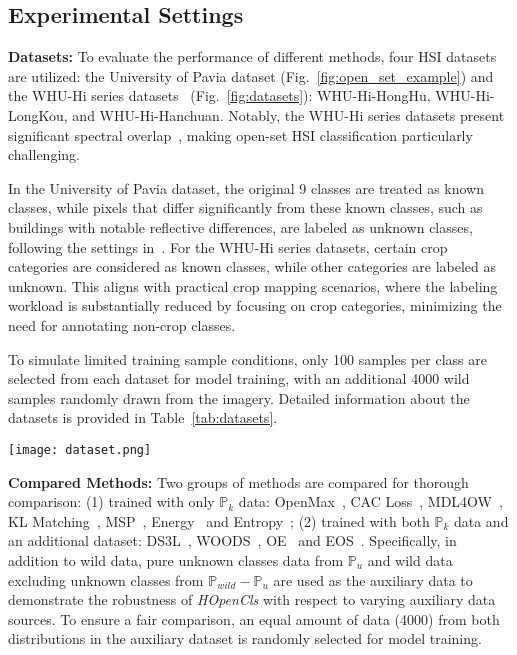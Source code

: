 \subsection{Experimental Settings}
\noindent \textbf{Datasets:}
To evaluate the performance of different methods, four HSI datasets are utilized: the University of Pavia dataset (Fig.~\ref{fig:open_set_example}) and the WHU-Hi series datasets~\cite{WHU-Hi} (Fig.~\ref{fig:datasets}): WHU-Hi-HongHu, WHU-Hi-LongKou, and WHU-Hi-Hanchuan. Notably, the WHU-Hi series datasets present significant spectral overlap~\cite{WHU-Hi}, making open-set HSI classification particularly challenging.

In the University of Pavia dataset, the original 9 classes are treated as known classes, while pixels that differ significantly from these known classes, such as buildings with notable reflective differences, are labeled as unknown classes, following the settings in~\cite{MDL4OW}. For the WHU-Hi series datasets, certain crop categories are considered as known classes, while other categories are labeled as unknown. This aligns with practical crop mapping scenarios, where the labeling workload is substantially reduced by focusing on crop categories, minimizing the need for annotating non-crop classes.

To simulate limited training sample conditions, only 100 samples per class are selected from each dataset for model training, with an additional 4000 wild samples randomly drawn from the imagery. Detailed information about the datasets is provided in Table~\ref{tab:datasets}.

\begin{figure*}[!t]
    \centering
    \texttt{[image: dataset.png]}
    \caption{The WHU-Hi series HSI datasets: WHU-Hi-HongHu, WHU-Hi-LongKou, and WHU-Hi-HanChuan.}
    \label{fig:datasets}
\end{figure*}



\noindent \textbf{Compared Methods:}
Two groups of methods are compared for thorough comparison: (1) trained with only $\mathbb{P}_{k}$ data: OpenMax~\cite{OpenMax}, CAC Loss~\cite{CACLoss}, MDL4OW~\cite{MDL4OW}, KL Matching~\cite{KLMatching}, MSP~\cite{MSP}, Energy~\cite{Energy} and Entropy~\cite{Entropy}; (2) trained with both $\mathbb{P}_{k}$ data and an additional dataset: DS3L~\cite{DS3L}, WOODS~\cite{WOODS}, OE~\cite{OE} and EOS~\cite{EOS}. Specifically, in addition to wild data, pure unknown classes data from $\mathbb{P}_{u}$ and wild data excluding unknown classes from $\mathbb{P}_{wild}-\mathbb{P}_{u}$ are used as the auxiliary data to demonstrate the robustness of \textit{HOpenCls} with respect to varying auxiliary data sources. To ensure a fair comparison, an equal amount of data (4000) from both distributions in the auxiliary dataset is randomly selected for model training.

